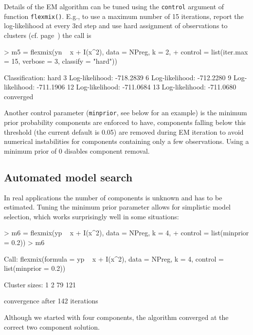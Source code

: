 \documentclass{jss}
\begin{document}
Details of the EM algorithm can be tuned using the \texttt{control}
argument of function \texttt{flexmix()}. E.g., to use a maximum number
of 15 iterations, report the log-likelihood at every 3rd step and use hard
assignment of observations to clusters (cf. page~\pageref{hard}) the
call is

\begin{Schunk}
\begin{Sinput}
> m5 = flexmix(yn ~ x + I(x^2), data = NPreg, k = 2, 
+     control = list(iter.max = 15, verbose = 3, classify = "hard"))
\end{Sinput}
\begin{Soutput}
Classification: hard 
   3 Log-likelihood:    -718.2839 
   6 Log-likelihood:    -712.2280 
   9 Log-likelihood:    -711.1906 
  12 Log-likelihood:    -711.0684 
  13 Log-likelihood:    -711.0680 
converged
\end{Soutput}
\end{Schunk}

Another control parameter (\texttt{minprior}, see below for an
example) is the minimum prior probability components are enforced to
have, components falling below this threshold (the current default is
0.05) are removed during EM iteration to avoid numerical instabilities
for components containing only a few observations. Using a minimum
prior of 0 disables component removal.



\subsection{Automated model search}

In real applications the number of components is unknown and has to be
estimated.  Tuning the minimum prior parameter allows for 
simplistic model selection, which works surprisingly well in some situations:
\begin{Schunk}
\begin{Sinput}
> m6 = flexmix(yp ~ x + I(x^2), data = NPreg, k = 4, 
+     control = list(minprior = 0.2))
> m6
\end{Sinput}
\begin{Soutput}
Call:
flexmix(formula = yp ~ x + I(x^2), data = NPreg, 
    k = 4, control = list(minprior = 0.2))

Cluster sizes:
  1   2 
 79 121 

convergence after 142 iterations
\end{Soutput}
\end{Schunk}
Although we started with four components, the algorithm converged at
the correct two component solution.
\end{document}
